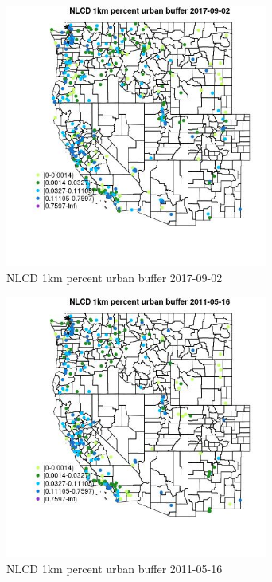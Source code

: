 \begin{figure} 
\centering  
\includegraphics[width=0.77\textwidth]{Code_Outputs/Report_ML_input_PM25_Step4_part_e_de_duplicated_aves_compiled_2019-05-21wNAs_MapObsNLCD_1km_percent_urban_buffer2017-09-02.jpg} 
\caption{\label{fig:Report_ML_input_PM25_Step4_part_e_de_duplicated_aves_compiled_2019-05-21wNAsMapObsNLCD_1km_percent_urban_buffer2017-09-02}NLCD 1km percent urban buffer 2017-09-02} 
\end{figure} 
 

\begin{figure} 
\centering  
\includegraphics[width=0.77\textwidth]{Code_Outputs/Report_ML_input_PM25_Step4_part_e_de_duplicated_aves_compiled_2019-05-21wNAs_MapObsNLCD_1km_percent_urban_buffer2011-05-16.jpg} 
\caption{\label{fig:Report_ML_input_PM25_Step4_part_e_de_duplicated_aves_compiled_2019-05-21wNAsMapObsNLCD_1km_percent_urban_buffer2011-05-16}NLCD 1km percent urban buffer 2011-05-16} 
\end{figure} 
 

